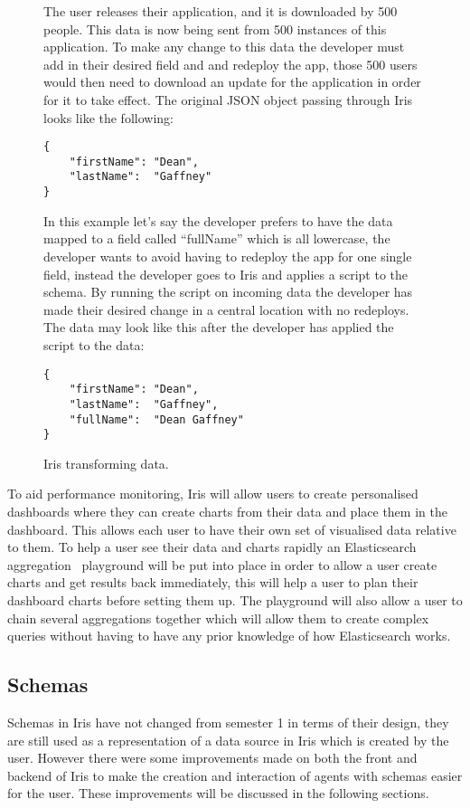 \documentclass[12pt,a4paper,titlepage]{report}
\newcommand{\q}[1]{``#1''}
\begin{document}
\begin{figure}[H]
\begin{tcolorbox}

The user releases their application, and it is downloaded by 500 people. This data is now being sent from 500 instances of this application. To make any change to this data the developer must add in their desired field and and redeploy the app, those 500 users would then need to download an update for the application in order for it to take effect. The original JSON object passing through Iris looks like the following:
\begin{verbatim}
{
	"firstName": "Dean",
	"lastName":  "Gaffney"
}
\end{verbatim}

In this example let's say the developer prefers to have the data mapped to a field called \q{fullName} which is all lowercase, the developer wants to avoid having to redeploy the app for one single field, instead the developer goes to Iris and applies a script to the schema. By running the script on incoming data the developer has made their desired change in a central location with no redeploys. The data may look like this after the developer has applied the script to the data:
\begin{verbatim}
{
	"firstName": "Dean",
	"lastName":  "Gaffney",
	"fullName":  "Dean Gaffney"
}
\end{verbatim}
\end{tcolorbox}
\caption{Iris transforming data.}
\end{figure}

To aid performance monitoring, Iris will allow users to create personalised dashboards where they can create charts from their data and place them in the dashboard. This allows each user to have their own set of visualised data relative to them. To help a user see their data and charts rapidly an Elasticsearch aggregation~\parencite{Elastic.co.Aggregations} playground will be put into place in order to allow a user create charts and get results back immediately, this will help a user to plan their dashboard charts before setting them up. The playground will also allow a user to chain several aggregations together which will allow them to create complex queries without having to have any prior knowledge of how Elasticsearch works.

 
\subsection{Schemas}
Schemas in Iris have not changed from semester 1 in terms of their design, they are still used as a representation of a data source in Iris which is created by the user. However there were some improvements made on both the front and backend of Iris to make the creation and interaction of agents with schemas easier for the user. These improvements will be discussed in the following sections.
\end{document}
